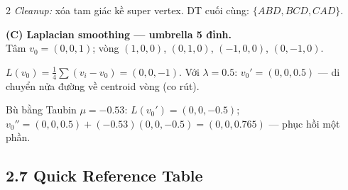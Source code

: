 \begin{paracol}{2}
\emph{Cleanup:} xóa tam giác kề super vertex. DT cuối cùng: $\{ABD,BCD,CAD\}$.

\textbf{(C) Laplacian smoothing — umbrella 5 đỉnh.}\\ Tâm $v_0{=}(0,0,1)$; vòng $(1,0,0)$, $(0,1,0)$, $({-}1,0,0)$, $(0,{-}1,0)$.

$L(v_0)=\tfrac14\sum(v_i-v_0)=(0,0,-1)$.
Với $\lambda=0.5$: $v_0'=(0,0,0.5)$ — di chuyển nửa đường về centroid vòng (co rút).

Bù bằng Taubin $\mu=-0.53$: $L(v_0')=(0,0,-0.5)$; $v_0''=(0,0,0.5)+(-0.53)(0,0,-0.5)=(0,0,0.765)$ — phục hồi một phần.

\switchcolumn*

\subsection*{2.7 Quick Reference Table}


\end{paracol}
